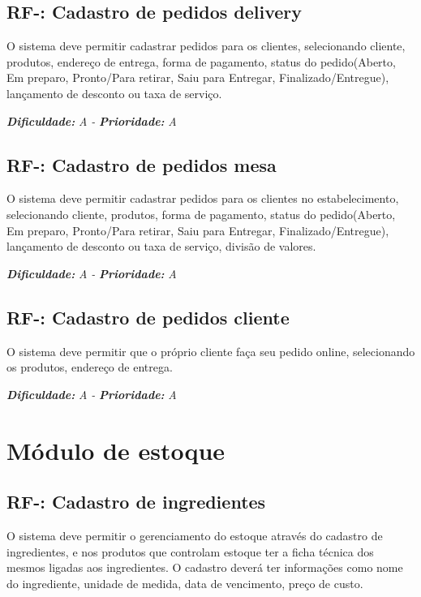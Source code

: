 \subsection{RF-\nreq: Cadastro de pedidos delivery}
O sistema deve permitir cadastrar pedidos para os clientes, selecionando cliente, produtos, endereço de entrega,
forma de pagamento, status do pedido(Aberto, Em preparo, Pronto/Para retirar, Saiu para Entregar, Finalizado/Entregue),
lançamento de desconto ou taxa de serviço.

\vspace{0.5cm}
\noindent\textbf{\textit{Dificuldade:}} \textit{A -} \textbf{\textit{Prioridade:}} \textit{A}
\vspace{0.5cm}

\pgfmathtruncatemacro{}
\subsection{RF-\nreq: Cadastro de pedidos mesa}
O sistema deve permitir cadastrar pedidos para os clientes no estabelecimento, selecionando cliente, produtos, 
forma de pagamento, status do pedido(Aberto, Em preparo, Pronto/Para retirar, Saiu para Entregar, Finalizado/Entregue),
lançamento de desconto ou taxa de serviço, divisão de valores.

\vspace{0.5cm}
\noindent\textbf{\textit{Dificuldade:}} \textit{A -} \textbf{\textit{Prioridade:}} \textit{A}
\vspace{0.5cm}

\pgfmathtruncatemacro{}
\subsection{RF-\nreq: Cadastro de pedidos cliente}
O sistema deve permitir que o próprio cliente faça seu pedido online, selecionando os produtos, endereço de entrega.

\vspace{0.5cm}
\noindent\textbf{\textit{Dificuldade:}} \textit{A -} \textbf{\textit{Prioridade:}} \textit{A}
\vspace{0.5cm}

\section{Módulo de estoque}
\vspace{0.5cm}
\pgfmathtruncatemacro{}
\subsection{RF-\nreq: Cadastro de ingredientes}
O sistema deve permitir o gerenciamento do estoque através do cadastro de ingredientes, e nos produtos que 
controlam estoque ter a ficha técnica dos mesmos ligadas aos ingredientes. O cadastro deverá ter informações
como nome do ingrediente, unidade de medida, data de vencimento, preço de custo.

